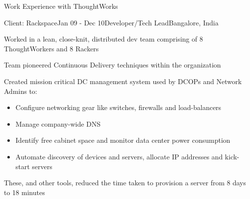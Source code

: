 \documentclass{resume} %
\begin{document}
\begin{rSection}{Work Experience with ThoughtWorks}

\begin{rSubsection}{Client: Rackspace}{Jan 09 - Dec 10}{Developer/Tech Lead}{Bangalore, India}
\item Worked in a lean, close-knit, distributed dev team comprising of 8 ThoughtWorkers and 8 Rackers
\item Team pioneered Continuous Delivery techniques within the organization
\item Created mission critical DC management system used by
  DCOPs and Network Admins to:
\begin{itemize}  \itemsep0.5pt \parskip0pt
    \item Configure networking gear like switches, firewalls and load-balancers
    \item Manage company-wide DNS
    \item Identify free cabinet space and monitor data center power consumption
    \item Automate discovery of devices and servers, allocate IP addresses and kick-start servers
\end{itemize}
\item These, and other tools, reduced the time taken to provision a server from 8 days to 18 minutes
\end{rSubsection}

\end{rSection}

\end{document}
